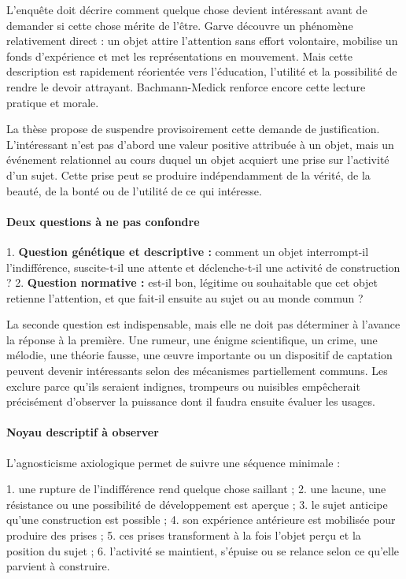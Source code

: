 \documentclass[10pt,a4paper]{article}
\begin{document}
L'enquête doit décrire comment quelque chose devient intéressant avant de demander si cette chose mérite de l'être. Garve découvre un phénomène relativement direct : un objet attire l'attention sans effort volontaire, mobilise un fonds d'expérience et met les représentations en mouvement. Mais cette description est rapidement réorientée vers l'éducation, l'utilité et la possibilité de rendre le devoir attrayant. Bachmann-Medick renforce encore cette lecture pratique et morale.

La thèse propose de suspendre provisoirement cette demande de justification. L'intéressant n'est pas d'abord une valeur positive attribuée à un objet, mais un événement relationnel au cours duquel un objet acquiert une prise sur l'activité d'un sujet. Cette prise peut se produire indépendamment de la vérité, de la beauté, de la bonté ou de l'utilité de ce qui intéresse.

\paragraph{Deux questions à ne pas confondre}
1. \textbf{Question génétique et descriptive :} comment un objet interrompt-il    l'indifférence, suscite-t-il une attente et déclenche-t-il une activité de    construction ? 2. \textbf{Question normative :} est-il bon, légitime ou souhaitable que cet objet    retienne l'attention, et que fait-il ensuite au sujet ou au monde commun ?

La seconde question est indispensable, mais elle ne doit pas déterminer à l'avance la réponse à la première. Une rumeur, une énigme scientifique, un crime, une mélodie, une théorie fausse, une œuvre importante ou un dispositif de captation peuvent devenir intéressants selon des mécanismes partiellement communs. Les exclure parce qu'ils seraient indignes, trompeurs ou nuisibles empêcherait précisément d'observer la puissance dont il faudra ensuite évaluer les usages.

\paragraph{Noyau descriptif à observer}
L'agnosticisme axiologique permet de suivre une séquence minimale :

1. une rupture de l'indifférence rend quelque chose saillant ; 2. une lacune, une résistance ou une possibilité de développement est aperçue ; 3. le sujet anticipe qu'une construction est possible ; 4. son expérience antérieure est mobilisée pour produire des prises ; 5. ces prises transforment à la fois l'objet perçu et la position du sujet ; 6. l'activité se maintient, s'épuise ou se relance selon ce qu'elle parvient à    construire.
\end{document}
